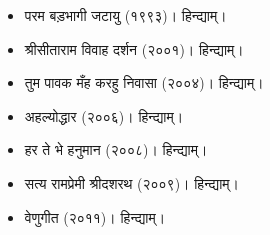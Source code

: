 \begin{itemize}
\begin{itemize}
\begin{itemize}
		\item परम बड़भागी जटायु (१९९३)। हिन्द्याम्।
		\item श्रीसीताराम विवाह दर्शन (२००१)। हिन्द्याम्।
		\item तुम पावक मँह करहु निवासा (२००४)। हिन्द्याम्।
		\item अहल्योद्धार (२००६)। हिन्द्याम्।
		\item हर ते भे हनुमान (२००८)। हिन्द्याम्।
		\item सत्य रामप्रेमी श्रीदशरथ (२००९)। हिन्द्याम्।
		\item वेणुगीत (२०११)। हिन्द्याम्।
		\end{itemize}
	\end{itemize}
\end{itemize}
